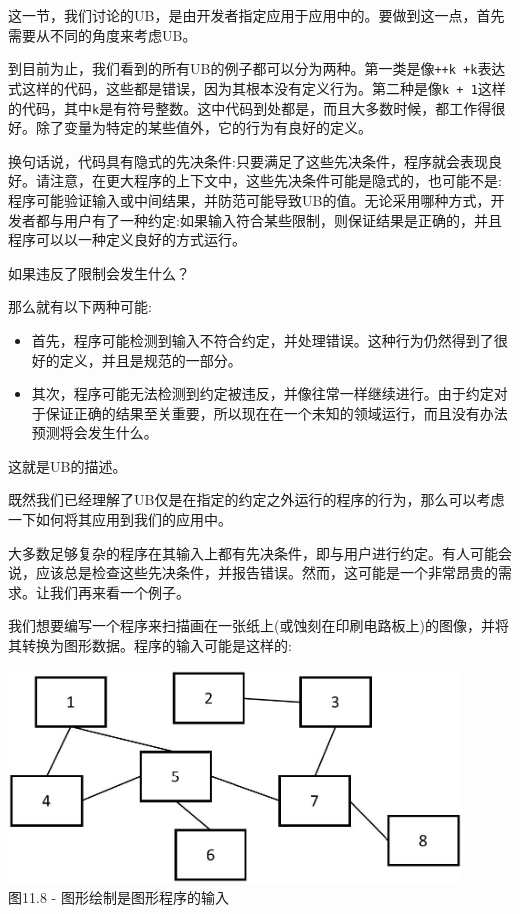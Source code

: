 这一节，我们讨论的UB，是由开发者指定应用于应用中的。要做到这一点，首先需要从不同的角度来考虑UB。 

到目前为止，我们看到的所有UB的例子都可以分为两种。第一类是像\texttt{++k +k}表达式这样的代码，这些都是错误，因为其根本没有定义行为。第二种是像\texttt{k + 1}这样的代码，其中\texttt{k}是有符号整数。这中代码到处都是，而且大多数时候，都工作得很好。除了变量为特定的某些值外，它的行为有良好的定义。

换句话说，代码具有隐式的先决条件:只要满足了这些先决条件，程序就会表现良好。请注意，在更大程序的上下文中，这些先决条件可能是隐式的，也可能不是:程序可能验证输入或中间结果，并防范可能导致UB的值。无论采用哪种方式，开发者都与用户有了一种约定:如果输入符合某些限制，则保证结果是正确的，并且程序可以以一种定义良好的方式运行。

如果违反了限制会发生什么？

那么就有以下两种可能:

\begin{itemize}
\item 
首先，程序可能检测到输入不符合约定，并处理错误。这种行为仍然得到了很好的定义，并且是规范的一部分。

\item 
其次，程序可能无法检测到约定被违反，并像往常一样继续进行。由于约定对于保证正确的结果至关重要，所以现在在一个未知的领域运行，而且没有办法预测将会发生什么。
\end{itemize}

这就是UB的描述。

既然我们已经理解了UB仅是在指定的约定之外运行的程序的行为，那么可以考虑一下如何将其应用到我们的应用中。

大多数足够复杂的程序在其输入上都有先决条件，即与用户进行约定。有人可能会说，应该总是检查这些先决条件，并报告错误。然而，这可能是一个非常昂贵的需求。让我们再来看一个例子。

我们想要编写一个程序来扫描画在一张纸上(或蚀刻在印刷电路板上)的图像，并将其转换为图形数据。程序的输入可能是这样的:

\begin{center}
\includegraphics[width=0.9\textwidth]{content/3/chapter11/images/8.jpg}\\
图11.8 - 图形绘制是图形程序的输入
\end{center}

